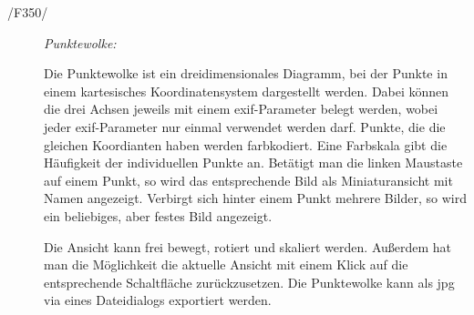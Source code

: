 \begin{description}
		\item[/F350/] \textit{Punktewolke:}\par		
			\begin{figure}[H]
				\centering
			\end{figure}
			Die Punktewolke ist ein dreidimensionales Diagramm, bei der Punkte in einem kartesisches Koordinatensystem dargestellt werden.
			Dabei können die drei Achsen jeweils mit einem \gls{exif}-Parameter belegt werden, wobei jeder \gls{exif}-Parameter nur einmal verwendet werden darf.
			Punkte, die die gleichen Koordianten haben werden farbkodiert. Eine Farbskala gibt die Häufigkeit der individuellen Punkte an.
			Betätigt man die linken Maustaste auf einem Punkt, so wird das entsprechende Bild als Miniaturansicht mit Namen angezeigt. Verbirgt sich hinter einem Punkt mehrere Bilder, so wird ein beliebiges, aber festes Bild angezeigt. 
			\par 
			
		Die Ansicht kann frei bewegt, rotiert und skaliert werden. Außerdem hat man die Möglichkeit die aktuelle Ansicht mit einem Klick auf die entsprechende Schaltfläche zurückzusetzen.
			Die Punktewolke kann als \gls{jpg} via eines Dateidialogs exportiert werden.

	\end{description}

